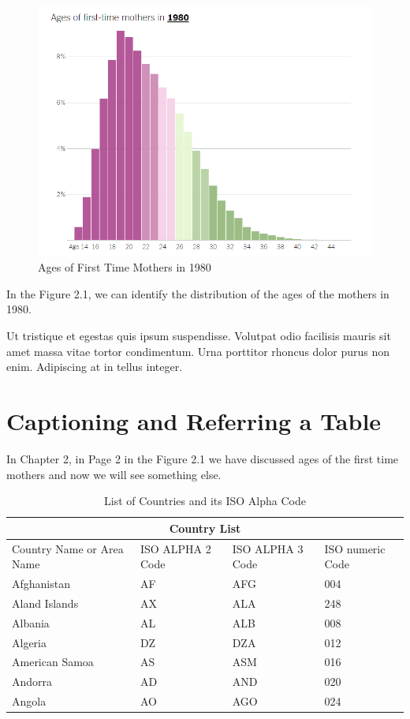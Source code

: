 \documentclass[oneside, 10pt]{book}
\begin{document}
\begin{figure}[htb!]
\centering
\includegraphics[scale=.4]{img/ages_first_mothers}
\caption{Ages of First Time Mothers in 1980}
\end{figure}

In the Figure 2.1, we can identify the distribution of the ages of the mothers in 1980. 

Ut tristique et egestas quis ipsum suspendisse. Volutpat odio facilisis mauris sit amet massa vitae tortor condimentum. Urna porttitor rhoncus dolor purus non enim. Adipiscing at in tellus integer.
\label{djfkdj}


\chapter{Captioning and Referring a Table}
In Chapter 2,  in Page 2 in the  Figure 2.1 we have discussed ages of the first time mothers and now we will see something else. 

\begin{table}[htb!]
\centering
\renewcommand*{\arraystretch}{1.25}
\begin{tabular}{ |p{3cm}|p{3cm}|p{3cm}|p{3cm}|  }
	\hline
	\multicolumn{4}{|c|}{\bf \large Country List} \\
	\hline
	Country Name     or Area Name& ISO ALPHA 2 Code &ISO ALPHA 3 Code&ISO numeric Code\\
	\hline
	Afghanistan   & AF    &AFG&   004\\
	Aland Islands&   AX  & ALA   &248\\
	Albania &AL & ALB&  008\\
	Algeria    &DZ & DZA&  012\\
	American Samoa&   AS  & ASM&016\\
	Andorra& AD  & AND   &020\\
	Angola& AO  & AGO&024\\
	\hline
\end{tabular}
\caption{List of Countries and its ISO Alpha Code}
\end{table}
\end{document}
